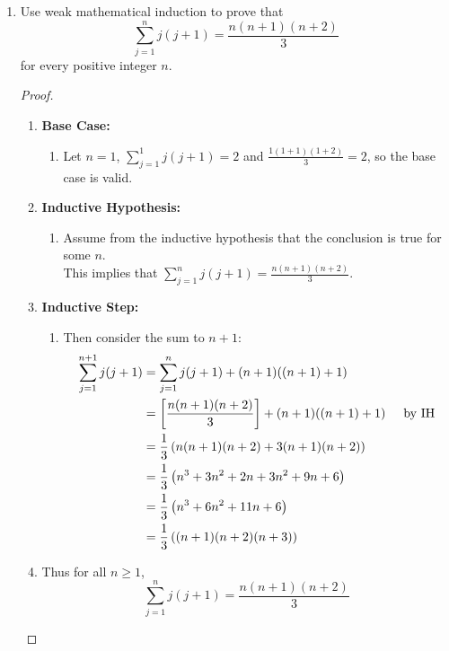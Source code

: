 \documentclass[class=article, crop=false]{standalone}
\def\inlinesum#1#2{\overset{#2}{\underset{#1}{\sum}}}
\begin{document}
\begin{enumerate}
	\item
	  Use weak mathematical induction to prove that
	  $$\inlinesum{j=1}{n}j(j+1)=\frac{n(n+1)(n+2)}3$$
	  for every positive integer $n$.
	  \begin{proof}
		$ $
		\begin{enumerate}
		  \item[] \textbf{Base Case:}
			\begin{enumerate}
			  \item[] Let $n=1$, $\sum_{j=1}^{1} j(j+1) = 2$ and $\frac{1(1+1)(1+2)}{3} = 2$, so the
			  base case is valid.
			\end{enumerate}
		  \item[] \textbf{Inductive Hypothesis:}
			\begin{enumerate}
			  \item[] Assume from the inductive hypothesis that the conclusion is true for some $n$.\\
			  This implies that $\sum_{j=1}^{n} j(j+1) = \frac{n(n+1)(n+2)}{3}$.
			\end{enumerate}
		  \item[] \textbf{Inductive Step:}
			\begin{enumerate}
			  \item[] Then consider the sum to $n+1$:
			  \begin{align*}
				\sum_{j=1}^{n+1}j(j+1) &= \sum_{j=1}^{n}j(j+1) + (n+1)((n+1)+1) \\
				&= \left[\frac{n(n+1)(n+2)}{3}\right] + (n+1)((n+1)+1) \hspace{5mm}\text{by IH} \\
				&= \frac{1}{3}\left(n(n+1)(n+2) + 3(n+1)(n+2)\right) \\
				&= \frac{1}{3}\left(n^3 + 3n^2 + 2n + 3n^2 + 9n + 6\right) \\
				&= \frac{1}{3}\left(n^3 + 6n^2 + 11n + 6\right) \\
				&= \frac{1}{3}\left((n+1)(n+2)(n+3)\right)
			  \end{align*}  
			\end{enumerate}
		  \item[] Thus for all $n\geq 1$, $$\sum_{j=1}^{n} j(j+1) = \frac{n(n+1)(n+2)}{3}$$     
		\end{enumerate}
	  \end{proof}
	

\end{enumerate}
\end{document}
